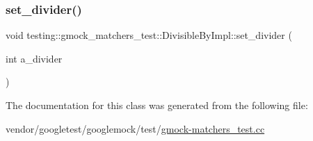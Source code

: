 \mbox{\label{classtesting_1_1gmock__matchers__test_1_1_divisible_by_impl_a86c8787ab835bc84a9ad7e3931d644cc}} 
\subsubsection{\texorpdfstring{set\+\_\+divider()}{set\_divider()}}
{\footnotesize\ttfamily void testing\+::gmock\+\_\+matchers\+\_\+test\+::\+Divisible\+By\+Impl\+::set\+\_\+divider (\begin{DoxyParamCaption}\item[{int}]{a\+\_\+divider }\end{DoxyParamCaption})\hspace{0.3cm}{\ttfamily [inline]}}



The documentation for this class was generated from the following file\+:\begin{DoxyCompactItemize}
\item 
vendor/googletest/googlemock/test/\hyperlink{gmock-matchers__test_8cc}{gmock-\/matchers\+\_\+test.\+cc}\end{DoxyCompactItemize}
